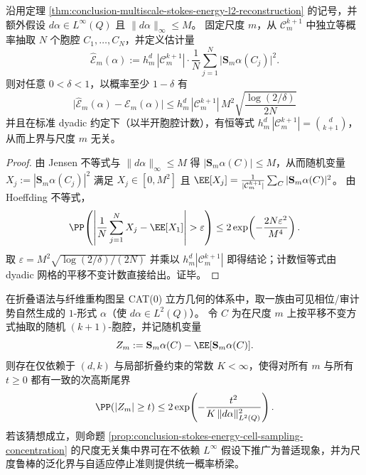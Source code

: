 \begin{proposition}[胞腔抽样下斯托克斯能量的尺度无关集中界]\label{prop:conclusion-stokes-energy-cell-sampling-concentration}
沿用定理 \ref{thm:conclusion-multiscale-stokes-energy-l2-reconstruction} 的记号，并额外假设 \(d\alpha\in L^\infty(Q)\) 且 \(\|d\alpha\|_\infty\le M\)。
固定尺度 \(m\)，从 \(\mathcal C_m^{k+1}\) 中独立等概率抽取 \(N\) 个胞腔 \(C_1,\dots,C_N\)，并定义估计量
\[
\widehat{\mathcal E}_m(\alpha)
:=
h_m^{d}\,|\mathcal C_m^{k+1}|\cdot \frac1N\sum_{j=1}^{N}\bigl|\mathbf S_m\alpha(C_j)\bigr|^2.
\]
则对任意 \(0<\delta<1\)，以概率至少 \(1-\delta\) 有
\[
\boxed{\;
\bigl|\widehat{\mathcal E}_m(\alpha)-\mathcal E_m(\alpha)\bigr|
\le
h_m^{d}\,|\mathcal C_m^{k+1}|\,M^2\sqrt{\frac{\log(2/\delta)}{2N}}\;}
\]
并且在标准 dyadic 约定下（以半开胞腔计数），有恒等式
\(
h_m^{d}\,|\mathcal C_m^{k+1}|=\binom{d}{k+1}
\)，
从而上界与尺度 \(m\) 无关。
\end{proposition}
\begin{proof}
由 Jensen 不等式与 \(\|d\alpha\|_\infty\le M\) 得
\(
|\mathbf S_m\alpha(C)|\le M
\)，从而随机变量
\(
X_j:=|\mathbf S_m\alpha(C_j)|^2
\)
满足 \(X_j\in[0,M^2]\) 且 \(\EE[X_j]=\frac1{|\mathcal C_m^{k+1}|}\sum_{C}|\mathbf S_m\alpha(C)|^2\)。
由 Hoeffding 不等式，
\[
\PP\!\left(\left|\frac1N\sum_{j=1}^N X_j-\EE[X_1]\right|>\varepsilon\right)
\le 2\exp\!\left(-\frac{2N\varepsilon^2}{M^4}\right).
\]
取 \(\varepsilon=M^2\sqrt{\log(2/\delta)/(2N)}\) 并乘以 \(h_m^{d}|\mathcal C_m^{k+1}|\) 即得结论；计数恒等式由 dyadic 网格的平移不变计数直接给出。证毕。
\end{proof}

\begin{conjecture}[折叠动力学诱导的斯托克斯胞腔平均的统一次高斯性]\label{conj:conclusion-stokes-energy-uniform-subgaussian}
在折叠语法与纤维重构图呈 CAT(0) 立方几何的体系中，取一族由可见相位/审计势自然生成的 \(1\)-形式 \(\alpha\)（使 \(d\alpha\in L^2(Q)\)）。
令 \(C\) 为在尺度 \(m\) 上按平移不变方式抽取的随机 \((k+1)\)-胞腔，并记随机变量
\[
Z_m:=\mathbf S_m\alpha(C)-\EE[\mathbf S_m\alpha(C)].
\]
则存在仅依赖于 \((d,k)\) 与局部折叠约束的常数 \(K<\infty\)，使得对所有 \(m\) 与所有 \(t\ge 0\) 都有一致的次高斯尾界
\[
\PP(|Z_m|\ge t)\le 2\exp\!\left(-\frac{t^2}{K\,\|d\alpha\|_{L^2(Q)}^2}\right).
\]
若该猜想成立，则命题 \ref{prop:conclusion-stokes-energy-cell-sampling-concentration} 的尺度无关集中界可在不依赖 \(L^\infty\) 假设下推广为普适现象，并为尺度鲁棒的泛化界与自适应停止准则提供统一概率桥梁。
\end{conjecture}

\endinput
